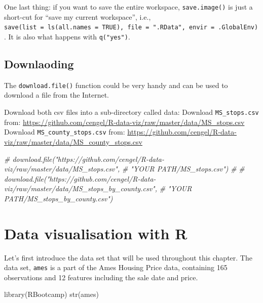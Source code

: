 \documentclass[
]{book}
\newenvironment{Shaded}{\begin{snugshade}}{\end{snugshade}}
\newcommand{\CommentTok}[1]{\textcolor[rgb]{0.56,0.35,0.01}{\textit{#1}}}
\newcommand{\FunctionTok}[1]{\textcolor[rgb]{0.00,0.00,0.00}{#1}}
\newcommand{\NormalTok}[1]{#1}
\begin{document}
One last thing: if you want to save the entire workspace, \texttt{save.image()} is just a short-cut for ``save my current workspace'', i.e., \texttt{save(list\ =\ ls(all.names\ =\ TRUE),\ file\ =\ ".RData",\ envir\ =\ .GlobalEnv)}. It is also what happens with \texttt{q("yes")}.

\hypertarget{downlaoding}{%
\section{Downlaoding}\label{downlaoding}}

The \texttt{download.file()} function could be very handy and can be used to download a file from the Internet.

Download both csv files into a sub-directory called data:
Download \texttt{MS\_stops.csv} from: \url{https://github.com/cengel/R-data-viz/raw/master/data/MS_stops.csv}
Download \texttt{MS\_county\_stops.csv} from: \url{https://github.com/cengel/R-data-viz/raw/master/data/MS_county_stops.csv}

\begin{Shaded}
\begin{Highlighting}[]
\CommentTok{\# download.file("https://github.com/cengel/R{-}data{-}viz/raw/master/data/MS\_stops.csv", }
\CommentTok{\#               "YOUR PATH/MS\_stops.csv")}
\CommentTok{\# }
\CommentTok{\# download.file("https://github.com/cengel/R{-}data{-}viz/raw/master/data/MS\_stops\_by\_county.csv", }
\CommentTok{\#               "YOUR PATH/MS\_stops\_by\_county.csv")}
\end{Highlighting}
\end{Shaded}

\hypertarget{data-visualisation-with-r}{%
\chapter{Data visualisation with R}\label{data-visualisation-with-r}}

Let's first introduce the data set that will be used throughout this chapter. The data set, \texttt{ames} is a part of the Ames Housing Price data, containing 165 observations and 12 features including the sale date and price.

\begin{Shaded}
\begin{Highlighting}[]
\FunctionTok{library}\NormalTok{(RBootcamp)}
\FunctionTok{str}\NormalTok{(ames)}
\end{Highlighting}
\end{Shaded}
\end{document}
